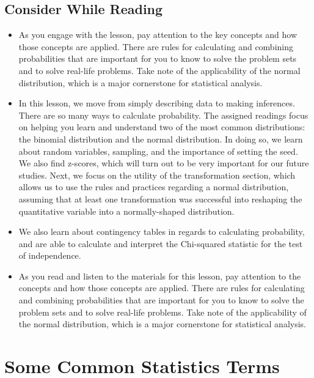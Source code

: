 \documentclass[
  letterpaper,
  DIV=11,
  numbers=noendperiod]{scrreprt}
\providecommand{\tightlist}{%
  \setlength{\itemsep}{0pt}\setlength{\parskip}{0pt}}\usepackage{longtable,booktabs,array}
\begin{document}
\subsection{Consider While Reading}\label{consider-while-reading-3}

\begin{itemize}
\tightlist
\item
  As you engage with the lesson, pay attention to the key concepts and
  how those concepts are applied. There are rules for calculating and
  combining probabilities that are important for you to know to solve
  the problem sets and to solve real-life problems. Take note of the
  applicability of the normal distribution, which is a major cornerstone
  for statistical analysis.
\item
  In this lesson, we move from simply describing data to making
  inferences. There are so many ways to calculate probability. The
  assigned readings focus on helping you learn and understand two of the
  most common distributions: the binomial distribution and the normal
  distribution. In doing so, we learn about random variables, sampling,
  and the importance of setting the seed. We also find z-scores, which
  will turn out to be very important for our future studies. Next, we
  focus on the utility of the transformation section, which allows us to
  use the rules and practices regarding a normal distribution, assuming
  that at least one transformation was successful into reshaping the
  quantitative variable into a normally-shaped distribution.
\item
  We also learn about contingency tables in regards to calculating
  probability, and are able to calculate and interpret the Chi-squared
  statistic for the test of independence.
\item
  As you read and listen to the materials for this lesson, pay attention
  to the concepts and how those concepts are applied. There are rules
  for calculating and combining probabilities that are important for you
  to know to solve the problem sets and to solve real-life problems.
  Take note of the applicability of the normal distribution, which is a
  major cornerstone for statistical analysis.
\end{itemize}

\section{Some Common Statistics
Terms}\label{some-common-statistics-terms}
\end{document}
